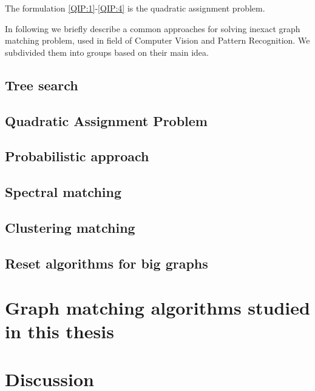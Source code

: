 The formulation \eqref{QIP:1}-\eqref{QIP:4} is the quadratic assignment problem.  


In following we briefly describe a common approaches for solving inexact graph matching problem, used in field of Computer Vision and Pattern Recognition. We subdivided them into groups based on their main idea.

\subsection{Tree search}

\subsection{Quadratic Assignment Problem}

\subsection{Probabilistic approach}

\subsection{Spectral matching}

\subsection{Clustering matching}

\subsection{Reset algorithms for big graphs}










\section{Graph matching algorithms studied in this thesis}

\section{Discussion}